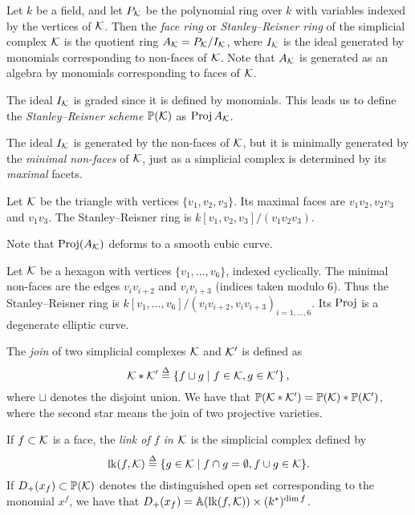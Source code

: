 Let $k$ be a field, and let $P_{\mathcal{K}}$ be the polynomial ring over $k$ with variables indexed by the vertices of $\mathcal{K}$. Then the \emph{face ring} or \emph{Stanley--Reisner ring} of the simplicial complex $\mathcal{K}$ is the quotient ring $A_{\mathcal{K}} = P_{\mathcal{K}}/I_{\mathcal{K}}$, where $I_{\mathcal{K}}$ is the ideal generated by monomials corresponding to non-faces of $\mathcal{K}$. Note that $A_{\mathcal{K}}$ is generated as an algebra by monomials corresponding to faces of $\mathcal{K}$.

The ideal $I_{\mathcal{K}}$ is graded since it is defined by monomials. This leads us to define the \emph{Stanley--Reisner scheme} $\mathbb{P}(\mathcal{K})$ as $\operatorname{Proj} A_{\mathcal{K}}$. 

\begin{remark}
The ideal $I_{\mathcal{K}}$ is generated by the non-faces of $\mathcal{K}$, but it is minimally generated by the \emph{minimal non-faces} of $\mathcal{K}$, just as a simplicial complex is determined by its \emph{maximal} facets.
\end{remark}

\begin{example}
Let $\mathcal{K}$ be the triangle with vertices $\{ v_1,v_2,v_3\}$. Its maximal faces are $v_1v_2, v_2v_3$ and $v_1v_3$. The Stanley--Reisner ring is $k[v_1,v_2,v_3]/(v_1v_2v_3)$.

Note that $\operatorname{Proj}(A_{\mathcal{K}})$ deforms to a smooth cubic curve.
\end{example}

\begin{example}
Let $\mathcal{K}$ be a hexagon with vertices $\{v_1,\ldots,v_6 \}$, indexed cyclically. The minimal non-faces are the edges $v_iv_{i+2}$ and $v_iv_{i+3}$ (indices taken modulo $6$). Thus the Stanley--Reisner ring is $k[v_1,\ldots,v_6]/\left(v_iv_{i+2},v_iv_{i+3}\right)_{i=1,\ldots,6}$. Its $\operatorname{Proj}$  is a degenerate elliptic curve.
\end{example}

The \emph{join} of two simplicial complexes $\mathcal{K}$ and $\mathcal{K}'$ is defined as
$$
\mathcal{K} \ast \mathcal{K}' \stackrel{\Delta}{=} \left\{ f \sqcup g \mid f \in \mathcal{K}, g \in \mathcal{K}' \right\},
$$
where $\sqcup$ denotes the disjoint union. We have that $\mathbb{P}(\mathcal{K} \ast \mathcal{K}') = \mathbb{P}(\mathcal{K}) \ast \mathbb{P}(\mathcal{K}')$, where the second star means the join of two projective varieties.

If $f \subset \mathcal{K}$ is a face, the \emph{link of $f$ in $\mathcal{K}$} is the simplicial complex defined by
$$
\mathrm{lk}(f,\mathcal{K}) \stackrel{\Delta}{=} \{ g \in \mathcal{K} \mid f \cap g = \emptyset, f \cup g \in \mathcal{K} \}.
$$
If $D_+(x_f) \subset \mathbb{P}(\mathcal{K})$ denotes the distinguished open set corresponding to the monomial $x^f$, we have that $D_+(x_f) = \mathbb{A}(\mathrm{lk}(f,\mathcal{K})) \times (k^\ast)^{\dim f}$. 

